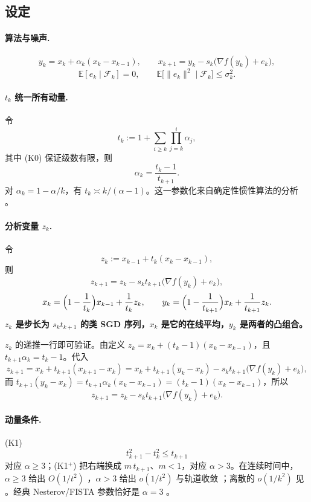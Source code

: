 \documentclass[11pt]{ctexart}
\newcommand{\E}{\mathbb{E}}
\newcommand{\F}{\mathcal{F}}
\begin{document}
\subsection{设定}

\paragraph{算法与噪声.}
\[
y_k=x_k+\alpha_k(x_k-x_{k-1}),
\qquad
x_{k+1}=y_k-s_k\bigl(\nabla f(y_k)+e_k\bigr),
\]
\[
\E[e_k\mid\F_k]=0,
\qquad
\E\bigl[\|e_k\|^2\mid\F_k\bigr]\le\sigma_k^2 .
\]

\paragraph{$t_k$ 统一所有动量.}
令
\[
t_k:=1+\sum_{i\ge k}\prod_{j=k}^{i}\alpha_j ,
\]
其中 (K0) 保证级数有限，则
\[
\alpha_k=\frac{t_k-1}{t_{k+1}} .
\]
对 $\alpha_k=1-\alpha/k$，有 $t_k\asymp k/(\alpha-1)$。这一参数化来自确定性惯性算法的分析 \citep{attouch2018cabot}。

\paragraph{分析变量 $z_k$.}
令
\[
z_k:=x_{k-1}+t_k(x_k-x_{k-1}),
\]
则
\[
z_{k+1}=z_k-s_kt_{k+1}\bigl(\nabla f(y_k)+e_k\bigr),
\]
\[
x_k=\Bigl(1-\frac1{t_k}\Bigr)x_{k-1}+\frac1{t_k}z_k,
\qquad
y_k=\Bigl(1-\frac1{t_{k+1}}\Bigr)x_k+\frac1{t_{k+1}}z_k .
\]
\textbf{$z_k$ 是步长为 $s_kt_{k+1}$ 的类 SGD 序列，$x_k$ 是它的在线平均，$y_k$ 是两者的凸组合。}

$z_k$ 的递推一行即可验证。由定义 $z_k=x_k+(t_k-1)(x_k-x_{k-1})$，且 $t_{k+1}\alpha_k=t_k-1$。代入
\[
z_{k+1}=x_k+t_{k+1}(x_{k+1}-x_k)
=x_k+t_{k+1}(y_k-x_k)-s_kt_{k+1}\bigl(\nabla f(y_k)+e_k\bigr),
\]
而 $t_{k+1}(y_k-x_k)=t_{k+1}\alpha_k(x_k-x_{k-1})=(t_k-1)(x_k-x_{k-1})$，所以
\[
z_{k+1}=z_k-s_kt_{k+1}\bigl(\nabla f(y_k)+e_k\bigr).
\]

\paragraph{动量条件.}
(K1)
\[
t_{k+1}^2-t_k^2\le t_{k+1}
\]
对应 $\alpha\ge3$；(K1$^+$) 把右端换成 $m\,t_{k+1}$、$m<1$，对应 $\alpha>3$。在连续时间中，$\alpha\ge3$ 给出 $O(1/t^2)$ \citep{su2016ode}，$\alpha>3$ 给出 $o(1/t^2)$ 与轨道收敛 \citep{attouch2018fast}；离散的 $o(1/k^2)$ 见 \citet{attouch2016rate}。经典 Nesterov/FISTA 参数恰好是 $\alpha=3$ \citep{nesterov1983,beck2009fista}。
\end{document}
